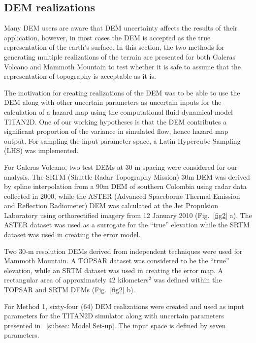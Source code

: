 \documentclass[12pt]{article}
\begin{document}
\subsection{DEM realizations}
Many DEM users are aware that DEM uncertainty affects the results of
their application, however, in most cases the DEM is accepted as the
true representation of the earth's surface. In this section, the two
methods for generating multiple realizations of the terrain are
presented for both Galeras Volcano and Mammoth Mountain to test
whether it is safe to assume that the representation of topography is
acceptable as it is.

The motivation for creating realizations of the DEM was to be able to
use the DEM along with other uncertain parameters as uncertain inputs
for the calculation of a hazard map using the computational fluid
dynamical model TITAN2D.  One of our working hypotheses is that the
DEM contributes a significant proportion of the variance in simulated
flow, hence hazard map output.  For sampling the input parameter
space, a Latin Hypercube Sampling (LHS) was implemented.

For Galeras Volcano, two test DEMs at 30 m spacing were considered for
our analysis. The SRTM (Shuttle Radar Topography Mission) 30m DEM was
derived by spline interpolation from a 90m DEM of southern Colombia
using radar data collected in 2000, while the ASTER (Advanced
Spaceborne Thermal Emission and Reflection Radiometer) DEM was
calculated at the Jet Propulsion Laboratory using orthorectified
imagery from 12 January 2010 (Fig.~\ref{fig2} a).  The ASTER dataset
was used as a surrogate for the ``true'' elevation while the SRTM
dataset was used in creating the error model.


Two 30-m resolution DEMs derived from independent techniques were used
for Mammoth Mountain.  A TOPSAR dataset was considered to be the
``true'' elevation, while an SRTM dataset was used in creating the
error map.  A rectangular area of approximately 42 kilometers$^2$ was
defined within the TOPSAR and SRTM DEMs (Fig.~\ref{fig2} b).

For Method 1, sixty-four (64) DEM realizations were created and used
as input parameters for the TITAN2D simulator along with uncertain
parameters presented in ~\ref{subsec: Model Set-up}.  The input space is defined
by seven parameters.


\end{document}
